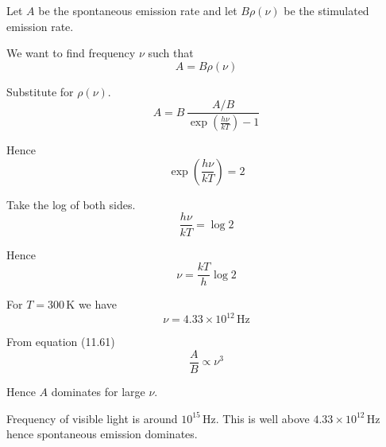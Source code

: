 



Let $A$ be the spontaneous emission rate and let $B\rho(\nu)$ be the stimulated emission rate.

\bigskip
We want to find frequency $\nu$ such that
\begin{equation*}
A=B\rho(\nu)
\end{equation*}

Substitute for $\rho(\nu)$.
\begin{equation*}
A=B\,\frac{A/B}{\exp\left(\frac{h\nu}{kT}\right)-1}
\end{equation*}

Hence
\begin{equation*}
\exp\left(\frac{h\nu}{kT}\right)=2
\end{equation*}

Take the log of both sides.
\begin{equation*}
\frac{h\nu}{kT}=\log2
\end{equation*}

Hence
\begin{equation*}
\nu=\frac{kT}{h}\log2
\end{equation*}

For $T=300\,\text{K}$ we have
\begin{equation*}
\nu=4.33\times10^{12}\,\text{Hz}
\end{equation*}

From equation (11.61)
\begin{equation*}
\frac{A}{B}\propto\nu^3
\end{equation*}

Hence $A$ dominates for large $\nu$.

\bigskip
Frequency of visible light is around $10^{15}\,\text{Hz}$.
This is well above $4.33\times10^{12}\,\text{Hz}$ hence spontaneous emission dominates.


